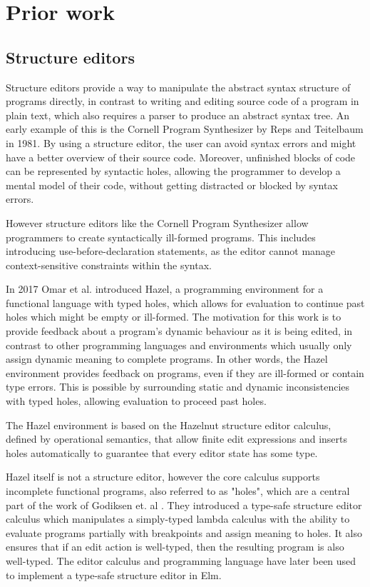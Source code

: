 \section{Prior work}

\subsection{Structure editors}
Structure editors provide a way to manipulate the abstract syntax structure of programs directly, in contrast to writing and editing source code of a program in plain text, which also requires a parser to produce an abstract syntax tree. An early example of this is the Cornell Program Synthesizer by Reps and Teitelbaum\cite{timtom81} in 1981.
By using a structure editor, the user can avoid syntax errors and might have a better overview of their source code. Moreover, unfinished blocks of code can be represented by syntactic holes, allowing the programmer to develop a mental model of their code, without getting distracted or blocked by syntax errors.

However structure editors like the Cornell Program Synthesizer\cite{timtom81} allow programmers to create syntactically ill-formed programs. This includes introducing use-before-declaration statements, as the editor cannot manage context-sensitive constraints within the syntax.

In 2017 Omar et al. introduced Hazel\cite{omar}, a programming environment for a functional language with typed holes, which allows for evaluation to continue past holes which might be empty or ill-formed. The motivation for this work is to provide feedback about a program's dynamic behaviour as it is being edited, in contrast to other programming languages and environments which usually only assign dynamic meaning to complete programs. In other words, the Hazel environment\cite{omar} provides feedback on programs, even if they are ill-formed or contain type errors. This is possible by surrounding static and dynamic inconsistencies with typed holes, allowing evaluation to proceed past holes.

The Hazel environment is based on the Hazelnut structure editor calculus, defined by operational semantics, that allow finite edit expressions and inserts holes automatically to guarantee that every editor state has some type.

Hazel itself is not a structure editor, however the core calculus supports incomplete functional programs, also referred to as "holes", which are a central part of the work of Godiksen et. al \cite{godiksen}. They introduced a type-safe structure editor calculus which manipulates a simply-typed lambda calculus with the ability to evaluate programs partially with breakpoints and assign meaning to holes. It also ensures that if an edit action is well-typed, then the resulting program is also well-typed. The editor calculus and programming language have later been used to implement a type-safe structure editor in Elm\cite{KU-bach-missing-ref}.

